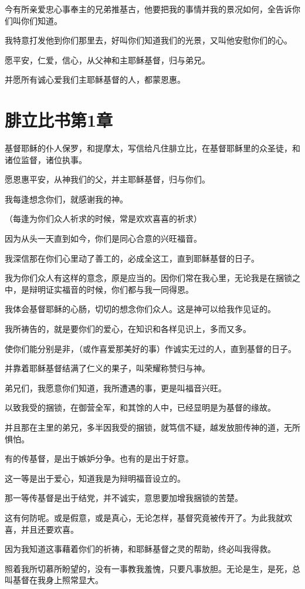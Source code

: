 \documentclass[12pt,oneside]{book}
\begin{document}
今有所亲爱忠心事奉主的兄弟推基古，他要把我的事情并我的景况如何，全告诉你们叫你们知道。

我特意打发他到你们那里去，好叫你们知道我们的光景，又叫他安慰你们的心。

愿平安，仁爱，信心，从父神和主耶稣基督，归与弟兄。

并愿所有诚心爱我们主耶稣基督的人，都蒙恩惠。

\chapter{腓立比书第1章}
基督耶稣的仆人保罗，和提摩太，写信给凡住腓立比，在基督耶稣里的众圣徒，和诸位监督，诸位执事。

愿恩惠平安，从神我们的父，并主耶稣基督，归与你们。

我每逢想念你们，就感谢我的神。

（每逢为你们众人祈求的时候，常是欢欢喜喜的祈求）

因为从头一天直到如今，你们是同心合意的兴旺福音。

我深信那在你们心里动了善工的，必成全这工，直到耶稣基督的日子。

我为你们众人有这样的意念，原是应当的。因你们常在我心里，无论我是在捆锁之中，是辩明证实福音的时候，你们都与我一同得恩。

我体会基督耶稣的心肠，切切的想念你们众人。这是神可以给我作见证的。

我所祷告的，就是要你们的爱心，在知识和各样见识上，多而又多。

使你们能分别是非，（或作喜爱那美好的事）作诚实无过的人，直到基督的日子。

并靠着耶稣基督结满了仁义的果子，叫荣耀称赞归与神。

弟兄们，我愿意你们知道，我所遭遇的事，更是叫福音兴旺。

以致我受的捆锁，在御营全军，和其馀的人中，已经显明是为基督的缘故。

并且那在主里的弟兄，多半因我受的捆锁，就笃信不疑，越发放胆传神的道，无所惧怕。

有的传基督，是出于嫉妒分争。也有的是出于好意。

这一等是出于爱心，知道我是为辩明福音设立的。

那一等传基督是出于结党，并不诚实，意思要加增我捆锁的苦楚。

这有何防呢。或是假意，或是真心，无论怎样，基督究竟被传开了。为此我就欢喜，并且还要欢喜。

因为我知道这事藉着你们的祈祷，和耶稣基督之灵的帮助，终必叫我得救。

照着我所切慕所盼望的，没有一事教我羞愧，只要凡事放胆。无论是生，是死，总叫基督在我身上照常显大。
\end{document}
